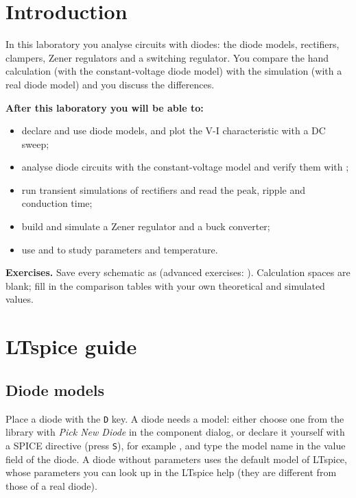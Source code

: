 
\section{Introduction}
In this laboratory you analyse circuits with diodes: the diode models, rectifiers, clampers, Zener regulators and a switching regulator. You compare the hand calculation (with the constant-voltage diode model) with the simulation (with a real diode model) and you discuss the differences.

\textbf{After this laboratory you will be able to:}
\begin{itemize}
  \item declare and use diode models, and plot the V-I characteristic with a DC sweep;
  \item analyse diode circuits with the constant-voltage model and verify them with ;
  \item run transient simulations of rectifiers and read the peak, ripple and conduction time;
  \item build and simulate a Zener regulator and a buck converter;
  \item use  and  to study parameters and temperature.
\end{itemize}

\textbf{Exercises.} Save every schematic as  (advanced exercises: ). Calculation spaces are blank; fill in the comparison tables with your own theoretical and simulated values.

\section{LTspice guide}

\subsection{Diode models}
Place a diode with the \texttt{D} key. A diode needs a model: either choose one from the library with \textit{Pick New Diode} in the component dialog, or declare it yourself with a SPICE directive (press \texttt{S}), for example , and type the model name in the value field of the diode. A diode without parameters uses the default model of LTspice, whose parameters you can look up in the LTspice help (they are different from those of a real diode).


